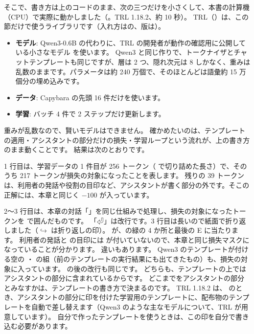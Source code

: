 そこで、書き方は上のコードのまま、次の三つだけを小さくして、本書の計算機（CPU）で実際に動かしました（。TRL 1.18.2、約 10 秒）。
TRL（）は、この節だけで使うライブラリです（入れ方はの、版は）。

\begin{itemize}
\item \textbf{モデル}: Qwen3-0.6B の代わりに、TRL の開発者が動作の確認用に公開している小さなモデル  を使います。
Qwen3 と同じ作りで、トークナイザとチャットテンプレートも同じですが、層は 2 つ、隠れ次元は 8 しかなく、重みは乱数のままです。パラメータは約 240 万個で、そのほとんどは語彙約 15 万個分の埋め込みです。
\item \textbf{データ}: Capybara の先頭 16 件だけを使います。
\item \textbf{学習}: バッチ 4 件で 2 ステップだけ更新します。
\end{itemize}

重みが乱数なので、賢いモデルはできません。
確かめたいのは、テンプレートの適用・アシスタントの部分だけの損失・学習ループという流れが、上の書き方のまま動くことです。
結果は次のとおりです。


1 行目は、学習データの 1 件目が 256 トークン（ で切り詰めた長さ）で、そのうち 217 トークンが損失の対象になったことを表します。
残りの 39 トークンは、利用者の発話や役割の目印など、アシスタントが書く部分の外です。そこの正解には、本章と同じく $-100$ が入っています。

2〜3 行目は、本章の対話「」を同じ仕組みで処理し、損失の対象になったトークンを \code{[ ]} で囲んだものです。
「⏎」は改行です。3 行目は長いので紙面で折り返しました（$\hookrightarrow$ は折り返しの印）。
\code{[4][7][です][。][<|im_end|>]} が、の緑の 4 か所と最後の E に当たります。
利用者の発話と  の目印には \code{[ ]} が付いていないので、本章と同じ損失マスクになっていることが分かります。
違いもあります。
Qwen3 のテンプレートが付ける空の ・ の組（前のテンプレートの実行結果にも出てきたもの）も、損失の対象に入っています。
 の後の改行も同じです。
どちらも、テンプレートの上ではアシスタントの部分に含まれているからです。
どこまでをアシスタントの部分とみなすかは、テンプレートの書き方で決まるのです。
TRL 1.18.2 は、 のとき、アシスタントの部分に印を付けた学習用のテンプレートに、配布物のテンプレートを自動で差し替えます（Qwen3 のような主なモデルについて、TRL が用意しています）。
自分で作ったテンプレートを使うときは、この印を自分で書き込む必要があります。

